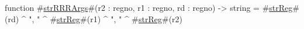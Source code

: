 function #\hyperref[zstrRRRArgs]{strRRRArgs}#(r2 : regno, r1 : regno, rd : regno) -> string = #\hyperref[zstrReg]{strReg}#(rd) ^ ", " ^ #\hyperref[zstrReg]{strReg}#(r1) ^ ", " ^ #\hyperref[zstrReg]{strReg}#(r2)
